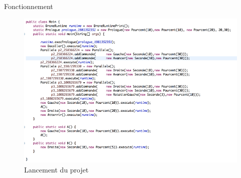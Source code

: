 \documentclass{bredelebeamer}
\begin{document}
\begin{frame}{Fonctionnement}
\begin{figure}
\centering
\includegraphics[scale=0.35]{images/ClasseGen.png}
\caption{Lancement du projet}
\end{figure}
\end{frame}
\end{document}
